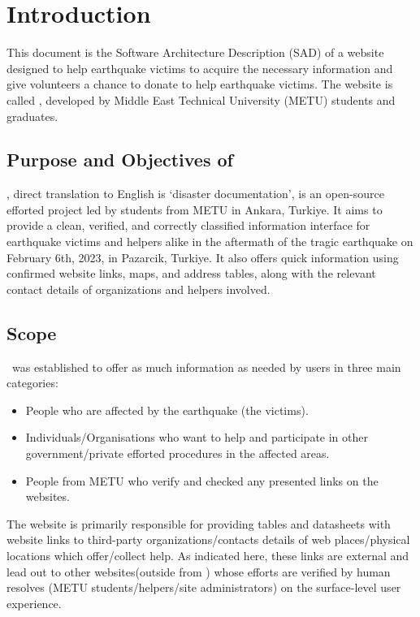 \section{Introduction}

This document is the Software Architecture Description (SAD) of a website designed to help earthquake victims to acquire the necessary information and give volunteers a chance to donate to help earthquake victims. The website is called \afetbilgi \cite{afetbilgi}, developed by Middle East Technical University (METU) students and graduates.

\subsection{Purpose and Objectives of \afetbilgi}

\afetbilgi, direct translation to English is `disaster documentation', is an open-source efforted project led by students from METU in Ankara, Turkiye. It aims to provide a clean, verified, and correctly classified information interface for earthquake victims and helpers alike in the aftermath of the tragic earthquake on February 6th, 2023, in Pazarcik, Turkiye. It also offers quick information using confirmed website links, maps, and address tables, along with the relevant contact details of organizations and helpers involved.

\subsection{Scope}

\afetbilgi\ was established to offer as much information as needed by users in three main categories:
\begin{itemize}
  \item People who are affected by the earthquake (the victims).
  \item Individuals/Organisations who want to help and participate in other government/private efforted procedures in the affected areas.
  \item People from METU who verify and checked any presented links on the websites.
\end{itemize}

The website is primarily responsible for providing tables and datasheets with website links to third-party organizations/contacts details of web places/physical locations which offer/collect help. As indicated here, these links are external and lead out to other websites(outside from \afetbilgi) whose efforts are verified by human resolves (METU students/helpers/site administrators) on the surface-level user experience.

